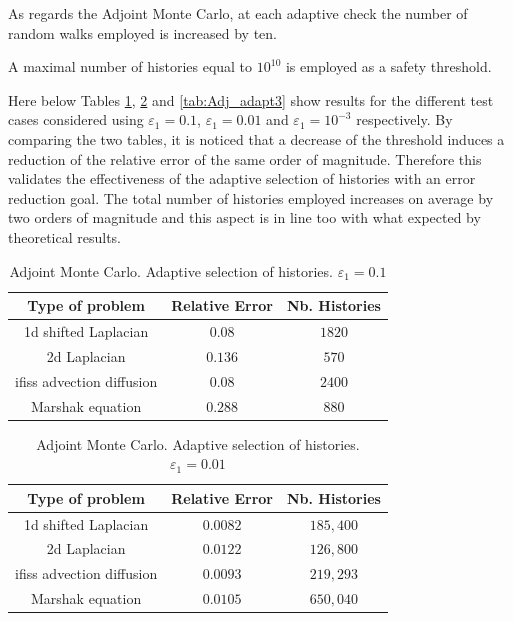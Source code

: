 As regards the Adjoint Monte Carlo, at each adaptive check the number of
random walks employed is increased by ten.

A maximal number of histories equal to $10^10$ is employed as a safety
threshold.

Here below Tables \ref{tab:Adj_adapt}, \ref{tab:Adj_adapt2} and
\ref{tab:Adj_adapt3} show results
for the different test cases
considered using $\varepsilon_1=0.1$, $\varepsilon_1=0.01$ and
$\varepsilon_1=10^{-3}$ respectively.
By comparing the two tables, it is noticed that a decrease of the threshold
induces a reduction of the relative error of the same order of magnitude.
Therefore this validates
the effectiveness of the adaptive selection of histories with an error
reduction goal. The total number of histories employed increases on average by
two orders of magnitude and this aspect is in line too with what expected by
theoretical results.

\begin{table}[!h]
\centering
\begin{tabular}{|c|c|c|}
\hline
\textbf{Type of problem} & \textbf{Relative Error} &\textbf{Nb. Histories}\\
\hline
1d shifted Laplacian & $0.08$ & $1820$\\
\hline
2d Laplacian & $0.136$ & $570$\\
\hline
ifiss advection diffusion & $0.08$  & $2400$\\
\hline
Marshak equation & $0.288$ & $880$\\
\hline
\end{tabular}
\caption{Adjoint Monte Carlo. Adaptive selection of histories.
$\varepsilon_1=0.1$}
\label{tab:Adj_adapt}
\end{table}

\begin{table}[!h]
\centering
\begin{tabular}{|c|c|c|}
\hline
\textbf{Type of problem} & \textbf{Relative Error} &\textbf{Nb. Histories}\\
\hline
1d shifted Laplacian & $0.0082$ & $185,400$\\
\hline
2d Laplacian & $0.0122$ & $126,800$\\
\hline
ifiss advection diffusion & $0.0093$  & $219,293$\\
\hline
Marshak equation & $0.0105$ & $650,040$\\
\hline
\end{tabular}
\caption{Adjoint Monte Carlo. Adaptive selection of histories.
$\varepsilon_1=0.01$}
\label{tab:Adj_adapt2}
\end{table}


